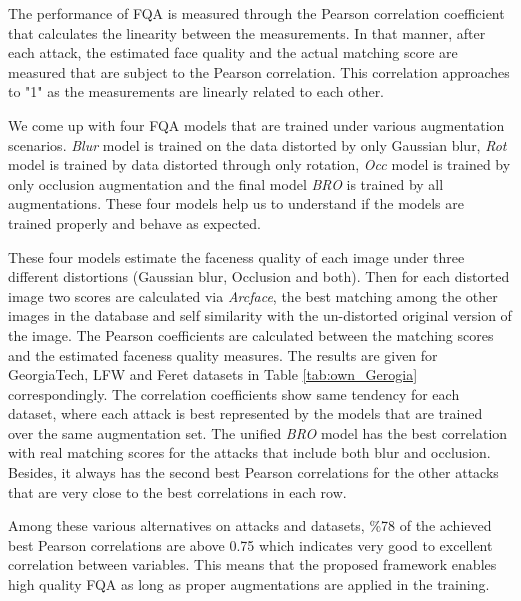 \documentclass[runningheads]{llncs}
\begin{document}
The performance of FQA is measured through the Pearson correlation coefficient that calculates the linearity between the measurements. In that manner, after each attack, the estimated face quality and the actual matching score are measured that are subject to the Pearson correlation. This correlation approaches to "1" as the measurements are linearly related to each other. 

We come up with four FQA models that are trained under various augmentation scenarios. \textit{Blur} model is trained on the data distorted by only Gaussian blur, \textit{Rot} model is trained by data distorted through only rotation, \textit{Occ} model is trained by only occlusion augmentation and the final model \textit{BRO} is trained by all augmentations. These four models help us to understand if the models are trained properly and behave as expected. 

These four models estimate the faceness quality of each image under three different distortions (Gaussian blur, Occlusion and both). Then for each distorted image two scores are calculated via \textit{Arcface}, the best matching among the other images in the database and self similarity with the un-distorted original version of the image. The Pearson coefficients are calculated between the matching scores and the estimated faceness quality measures. The results are given for GeorgiaTech, LFW and Feret datasets in Table \ref{tab:own_Gerogia} correspondingly. The correlation coefficients show same tendency for each dataset, where each attack is best represented by the models that are trained over the same augmentation set. The unified \textit{BRO} model has the best correlation with real matching scores for the attacks that include both blur and occlusion. Besides, it always has the second best Pearson correlations for the other attacks that are very close to the best correlations in each row. 

Among these various alternatives on attacks and datasets, \%78 of the achieved best Pearson correlations are above 0.75 which indicates very good to excellent correlation between variables. This means that the proposed framework enables high quality FQA as long as proper augmentations are applied in the training. 
\end{document}
